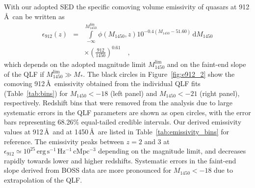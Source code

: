 \documentclass[fleqn,usenatbib]{mnras}
\begin{document}
With our adopted SED the specific comoving volume emissivity of
quasars at 912\,\AA\ can be written as
\begin{eqnarray}\nonumber
\epsilon_{912}\left(z\right)&=&\int\limits_{-\infty}^{M_{1450}^\mathrm{lim}}\phi\left(M_{1450},z\right)10^{-0.4\left(M_{1450}-51.60\right)}\,\mathrm{d}M_{1450}\\
& &\times\left(\frac{912}{1450}\right)^{0.61}\quad,
\label{eqn:epsilon}
\end{eqnarray}
which depends on the adopted magnitude limit $M_{1450}^\mathrm{lim}$
and on the faint-end slope of the QLF if $M_{1450}^\mathrm{lim}\gg
M_*$.  The black circles in Figure~\ref{fig:e912_2} show the comoving
912\,\AA\ emissivity obtained from the individual QLF fits
(Table~\ref{tab:bins}) for $M_{1450}<-18$ (left panel) and
$M_{1450}<-21$ (right panel), respectively. Redshift bins that were
removed from the analysis due to large systematic errors in the QLF
parameters are shown as open circles, with the error bars representing
68.26\% equal-tailed credible intervals.  Our derived emissivity
values at 912\,\AA\ and at 1450\,\AA\ are listed in
Table~\ref{tab:emissivity_bins} for reference.  The emissivity peaks
between $z=2$ and 3 at $\epsilon_{912}\simeq 10^{25}\,\mathrm{erg\,
  s^{-1}\, Hz^{-1}\, cMpc^{-3}}$ depending on the magnitude limit, and
decreases rapidly towards lower and higher redshifts.  Systematic
errors in the faint-end slope derived from BOSS data are more
pronounced for $M_{1450}<-18$ due to extrapolation of the QLF.
\end{document}
